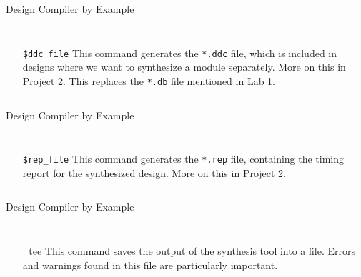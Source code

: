 \documentclass[dvipsnames]{beamer}
\begin{document}
\begin{frame}{Design Compiler by Example}
	\inputminted[fontsize=\scriptsize,frame=lines,firstline=121,lastline=121]{tcl}{scripts/tut_synth.tcl}
	\begin{columns}
		\begin{column}[c]{0.75\textwidth}
			\begin{itemize}
				\item[\texttt{\$ddc\_file}] This command generates the
					\texttt{*.ddc} file, which is included in designs where we
					want to synthesize a module separately. More on this in 
					Project 2. This replaces the \texttt{*.db} file mentioned in
					Lab 1.
			\end{itemize}
		\end{column}
	\end{columns}
\end{frame}

\begin{frame}{Design Compiler by Example}
	\inputminted[fontsize=\scriptsize,frame=lines,firstline=122,lastline=125]{tcl}{scripts/tut_synth.tcl}
	\begin{columns}
		\begin{column}[c]{0.75\textwidth}
			\begin{itemize}
				\item[\texttt{\$rep\_file}] This command generates the
					\texttt{*.rep} file, containing the timing report for the
					synthesized design. More on this in Project 2.
			\end{itemize}
		\end{column}
	\end{columns}
\end{frame}

\begin{frame}{Design Compiler by Example}
	\inputminted[fontsize=\scriptsize,frame=lines,firstline=44,lastline=45]{makefile}{scripts/Makefile}
	\begin{columns}
		\begin{column}[c]{0.75\textwidth}
			\begin{itemize}
				\item[$|$ tee] This command saves the output of the synthesis
					tool into a file. Errors and warnings found in this file are
					particularly important.
			\end{itemize}
		\end{column}
	\end{columns}
\end{frame}
\end{document}
